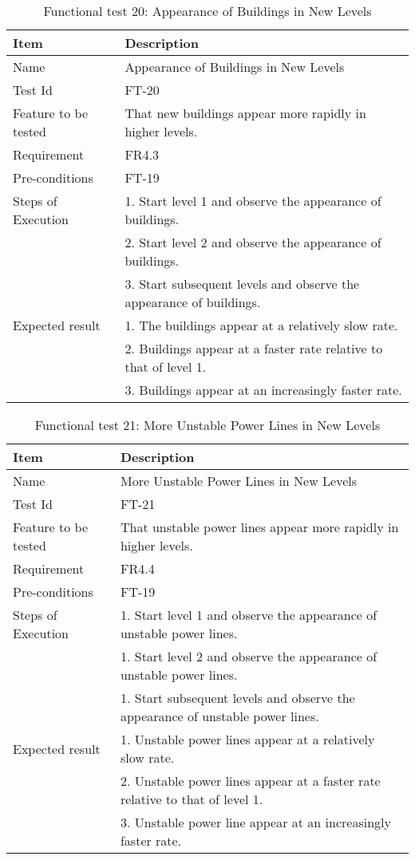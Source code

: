 \begin{table}[H]
\centering
	\begin{tabular}{ l | p{8cm} }
		\hline
		\rowcolor{lightgray}
		{\bf Item} & {\bf Description} \\ \hline
		Name & Appearance of Buildings in New Levels \\ 
		Test Id & FT-20 \\ 
		Feature to be tested & That new buildings appear more rapidly in higher levels. \\ 
		Requirement & FR4.3 \\ 
		Pre-conditions & FT-19 \\ 
		Steps of Execution & 1. Start level 1 and observe the appearance of buildings. \\ 
		& 2. Start level 2 and observe the appearance of buildings. \\
		& 3. Start subsequent levels and observe the appearance of buildings. \\
		Expected result & 1. The buildings appear at a relatively slow rate. \\
		& 2. Buildings appear at a faster rate relative to that of level 1. \\
		& 3. Buildings appear at an increasingly faster rate. \\
		\hline
	\end{tabular}
	\caption{Functional test 20: Appearance of Buildings in New Levels}
\end{table}

\begin{table}[H]
\centering
	\begin{tabular}{ l | p{8cm} }
		\hline
		\rowcolor{lightgray}
		{\bf Item} & {\bf Description} \\ \hline
		Name & More Unstable Power Lines in New Levels \\ 
		Test Id & FT-21 \\ 
		Feature to be tested & That unstable power lines appear more rapidly in higher levels. \\ 
		Requirement & FR4.4 \\ 
		Pre-conditions & FT-19 \\ 
		Steps of Execution & 1. Start level 1 and observe the appearance of unstable power lines. \\
		& 1. Start level 2 and observe the appearance of unstable power lines. \\ 
		& 1. Start subsequent levels and observe the appearance of unstable power lines. \\  
		Expected result & 1. Unstable power lines appear at a relatively slow rate. \\
		& 2. Unstable power lines appear at a faster rate relative to that of level 1. \\
		& 3. Unstable power line appear at an increasingly faster rate. \\
		\hline
	\end{tabular}
	\caption{Functional test 21: More Unstable Power Lines in New Levels}
\end{table}

